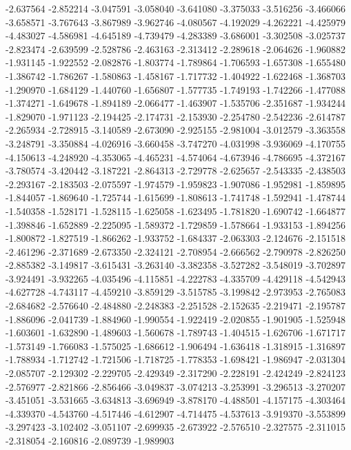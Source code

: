 -2.637564
-2.852214
-3.047591
-3.058040
-3.641080
-3.375033
-3.516256
-3.466066
-3.658571
-3.767643
-3.867989
-3.962746
-4.080567
-4.192029
-4.262221
-4.425979
-4.483027
-4.586981
-4.645189
-4.739479
-4.283389
-3.686001
-3.302508
-3.025737
-2.823474
-2.639599
-2.528786
-2.463163
-2.313412
-2.289618
-2.064626
-1.960882
-1.931145
-1.922552
-2.082876
-1.803774
-1.789864
-1.706593
-1.657308
-1.655480
-1.386742
-1.786267
-1.580863
-1.458167
-1.717732
-1.404922
-1.622468
-1.368703
-1.290970
-1.684129
-1.440760
-1.656807
-1.577735
-1.749193
-1.742266
-1.477088
-1.374271
-1.649678
-1.894189
-2.066477
-1.463907
-1.535706
-2.351687
-1.934244
-1.829070
-1.971123
-2.194425
-2.174731
-2.153930
-2.254780
-2.542236
-2.614787
-2.265934
-2.728915
-3.140589
-2.673090
-2.925155
-2.981004
-3.012579
-3.363558
-3.248791
-3.350884
-4.026916
-3.660458
-3.747270
-4.031998
-3.936069
-4.170755
-4.150613
-4.248920
-4.353065
-4.465231
-4.574064
-4.673946
-4.786695
-4.372167
-3.780574
-3.420442
-3.187221
-2.864313
-2.729778
-2.625657
-2.543335
-2.438503
-2.293167
-2.183503
-2.075597
-1.974579
-1.959823
-1.907086
-1.952981
-1.859895
-1.844057
-1.869640
-1.725744
-1.615699
-1.808613
-1.741748
-1.592941
-1.478744
-1.540358
-1.528171
-1.528115
-1.625058
-1.623495
-1.781820
-1.690742
-1.664877
-1.398846
-1.652889
-2.225095
-1.589372
-1.729859
-1.578664
-1.933153
-1.894256
-1.800872
-1.827519
-1.866262
-1.933752
-1.684337
-2.063303
-2.124676
-2.151518
-2.461296
-2.371689
-2.673350
-2.324121
-2.708954
-2.666562
-2.790978
-2.826250
-2.885382
-3.149817
-3.615431
-3.263140
-3.382358
-3.527282
-3.548019
-3.702897
-3.924491
-3.932265
-4.035496
-4.115851
-4.222783
-4.335709
-4.429118
-4.542943
-4.627728
-4.743117
-4.459210
-3.859129
-3.515785
-3.199842
-2.973953
-2.765083
-2.684682
-2.576640
-2.484880
-2.248383
-2.251528
-2.152635
-2.219471
-2.195787
-1.886096
-2.041739
-1.884960
-1.990554
-1.922419
-2.020855
-1.901905
-1.525948
-1.603601
-1.632890
-1.489603
-1.560678
-1.789743
-1.404515
-1.626706
-1.671717
-1.573149
-1.766083
-1.575025
-1.686612
-1.906494
-1.636418
-1.318915
-1.316897
-1.788934
-1.712742
-1.721506
-1.718725
-1.778353
-1.698421
-1.986947
-2.031304
-2.085707
-2.129302
-2.229705
-2.429349
-2.317290
-2.228191
-2.424249
-2.824123
-2.576977
-2.821866
-2.856466
-3.049837
-3.074213
-3.253991
-3.296513
-3.270207
-3.451051
-3.531665
-3.634813
-3.696949
-3.878170
-4.488501
-4.157175
-4.303464
-4.339370
-4.543760
-4.517446
-4.612907
-4.714475
-4.537613
-3.919370
-3.553899
-3.297423
-3.102402
-3.051107
-2.699935
-2.673922
-2.576510
-2.327575
-2.311015
-2.318054
-2.160816
-2.089739
-1.989903
